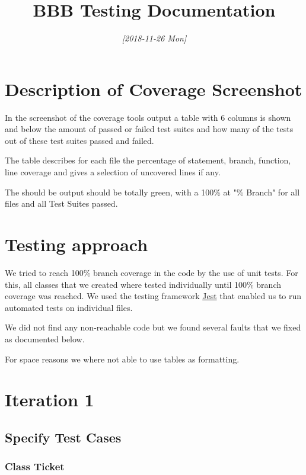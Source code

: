 \documentclass[11pt]{article}
\date{\textit{[2018-11-26 Mon]}}
\title{BBB Testing Documentation}
\begin{document}
\maketitle
\tableofcontents


\section{Description of Coverage Screenshot}
\label{sec:orgd7438ea}

In the screenshot of the coverage tools output a table with 6 columns
is shown and below the amount of passed or failed test suites and how
many of the tests out of these test suites passed and failed.

The table describes for each file the percentage of statement, branch,
function, line coverage and gives a selection of uncovered lines if
any.

The should be output should be totally green, with a 100\% at "\%
Branch" for all files and all Test Suites passed.

\section{Testing approach}
\label{sec:org1b30c02}

We tried to reach 100\% branch coverage in the code by the use of unit
tests. For this, all classes that we created where tested individually
until 100\% branch coverage was reached. We used the testing framework
\href{https://jestjs.io/en/}{Jest} that enabled us to run automated tests on individual files.

We did not find any non-reachable code but we found several faults that
we fixed as documented below.

For space reasons we where not able to use tables as formatting.

\section{Iteration 1}
\label{sec:org09321b1}

\subsection{Specify Test Cases}
\label{sec:orgcecfc8b}

\subsubsection{Class Ticket}
\label{sec:orged4b990}
\end{document}
